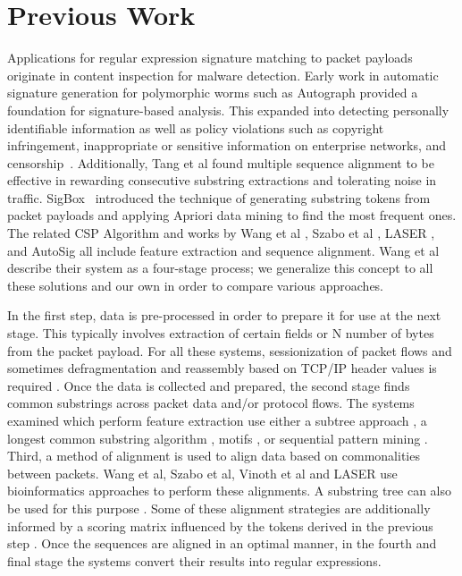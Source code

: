 \section{Previous Work}

Applications for regular expression signature matching to packet payloads originate in content inspection for malware detection. Early work in automatic signature generation for polymorphic worms such as Autograph \cite{KimHyangAh} provided a foundation for signature-based analysis. This expanded into detecting personally identifiable information as well as policy violations such as copyright infringement, inappropriate or sensitive information on enterprise networks, and censorship~\cite{}. Additionally, Tang et al \cite{TANG2009827} found multiple sequence alignment to be effective in rewarding consecutive substring extractions and tolerating noise in traffic. SigBox~\cite{Shim2017SigBoxAS} introduced the technique of generating substring tokens from packet payloads and applying Apriori data mining to find the most frequent ones. The related CSP Algorithm \cite{Sija} and works by Wang et al \cite{WANG2012992}, Szabo et al \cite{Szabo}, LASER \cite{LASER}, and AutoSig \cite{AutoSig} all include feature extraction and sequence alignment. Wang et al describe their system as a four-stage process; we generalize this concept to all these solutions and our own in order to compare various approaches.

In the first step, data is pre-processed in order to prepare it for use at the next stage. This typically involves extraction of certain fields or N number of bytes from the packet payload. For all these systems, sessionization of packet flows and sometimes defragmentation and reassembly based on TCP/IP header values is required \cite{Shim2017SigBoxAS, WANG2012992, Sija, Szabo, AutoSig, LASER}. Once the data is collected and prepared, the second stage finds common substrings across packet data and/or protocol flows. The systems examined which perform feature extraction use either a subtree approach \cite{WANG2012992}, a longest common substring algorithm \cite{AutoSig, LASER}, motifs \cite{Szabo}, or sequential pattern mining \cite{Shim2017SigBoxAS, Sija}. Third, a method of alignment is used to align data based on commonalities between packets. Wang et al, Szabo et al, Vinoth et al \cite{VinothGeorge2013EfficientRE} and LASER use bioinformatics approaches to perform these alignments. A substring tree can also be used for this purpose \cite{AutoSig}. Some of these alignment strategies are additionally informed by a scoring matrix influenced by the tokens derived in the previous step \cite{WANG2012992, Szabo, LASER}. Once the sequences are aligned in an optimal manner, in the fourth and final stage the systems convert their results into regular expressions.

